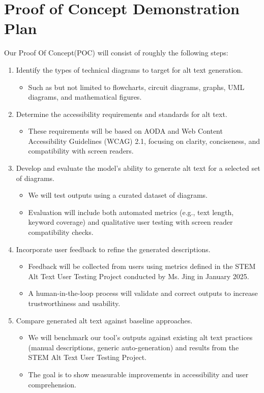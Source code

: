\documentclass{article}
\begin{document}
\section{Proof of Concept Demonstration Plan}

Our Proof Of Concept(POC) will consist of roughly the following steps:
\begin{enumerate}
    \item Identify the types of technical diagrams to target for alt text generation.
    \begin{itemize}
        \item Such as but not limited to flowcharts, circuit diagrams, graphs, UML diagrams, and mathematical figures.
    \end{itemize}

    \item Determine the accessibility requirements and standards for alt text.
    \begin{itemize}
        \item These requirements will be based on AODA and Web Content Accessibility Guidelines (WCAG) 2.1, focusing on clarity, conciseness, and compatibility with screen readers.
    \end{itemize}

    \item Develop and evaluate the model’s ability to generate alt text for a selected set of diagrams.
    \begin{itemize}
        \item We will test outputs using a curated dataset of diagrams.
        \item Evaluation will include both automated metrics (e.g., text length, keyword coverage) and qualitative user testing with screen reader compatibility checks.
    \end{itemize}

    \item Incorporate user feedback to refine the generated descriptions.
    \begin{itemize}
        \item Feedback will be collected from users using metrics defined in the STEM Alt Text User Testing Project conducted by Ms. Jing in January 2025.
        \item A human-in-the-loop process will validate and correct outputs to increase trustworthiness and usability.
    \end{itemize}

    \item Compare generated alt text against baseline approaches.
    \begin{itemize}
        \item We will benchmark our tool’s outputs against existing alt text practices (manual descriptions, generic auto-generation) and results from the STEM Alt Text User Testing Project.
        \item The goal is to show measurable improvements in accessibility and user comprehension.
    \end{itemize}


\end{enumerate}
\end{document}
